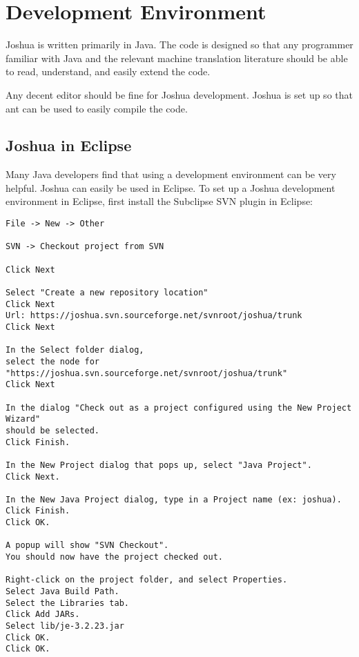 \chapter{Development Environment}

Joshua is written primarily in Java. The code is designed so that any programmer familiar with Java and the relevant machine translation literature should be able to read, understand, and easily extend the code.

Any decent editor should be fine for Joshua development. Joshua is set up so that ant can be used to easily compile the code.

\section{Joshua in Eclipse}

Many Java developers find that using a development environment can be very helpful. Joshua can easily be used in Eclipse. To set up a Joshua development environment in Eclipse, first install the Subclipse SVN plugin in Eclipse:

\begin{verbatim}
File -> New -> Other

SVN -> Checkout project from SVN

Click Next

Select "Create a new repository location" 
Click Next
Url: https://joshua.svn.sourceforge.net/svnroot/joshua/trunk
Click Next

In the Select folder dialog, 
select the node for "https://joshua.svn.sourceforge.net/svnroot/joshua/trunk"
Click Next

In the dialog "Check out as a project configured using the New Project Wizard" 
should be selected.
Click Finish.

In the New Project dialog that pops up, select "Java Project".
Click Next.

In the New Java Project dialog, type in a Project name (ex: joshua).
Click Finish.
Click OK.

A popup will show "SVN Checkout".
You should now have the project checked out.

Right-click on the project folder, and select Properties.
Select Java Build Path.
Select the Libraries tab.
Click Add JARs.
Select lib/je-3.2.23.jar
Click OK.
Click OK.
\end{verbatim}
